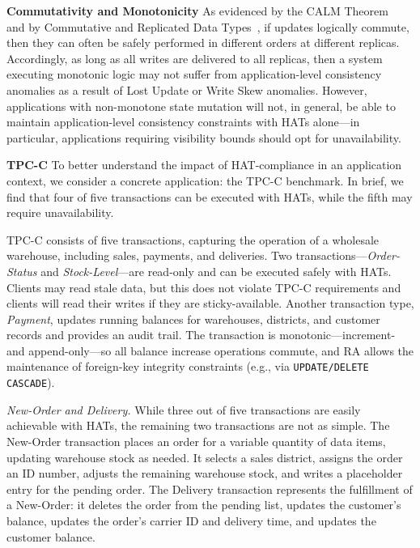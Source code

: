 \vspace{.5em}\noindent\textbf{Commutativity and Monotonicity} As
evidenced by the CALM Theorem~\cite{calm} and by Commutative and
Replicated Data Types~\cite{crdt}, if updates logically commute, then
they can often be safely performed in different orders at different
replicas. Accordingly, as long as all writes are delivered to all
replicas, then a system executing monotonic logic may not suffer from
application-level consistency anomalies as a result of Lost Update or
Write Skew anomalies. However, applications with non-monotone state
mutation will not, in general, be able to maintain application-level
consistency constraints with HATs alone---in particular, applications
requiring visibility bounds should opt for unavailability.

\vspace{.5em}\noindent\textbf{TPC-C} To better understand the impact
of HAT-compliance in an application context, we consider a concrete
application: the TPC-C benchmark. In brief, we find that four of five
transactions can be executed with HATs, while the fifth may require
unavailability.

TPC-C consists of five transactions, capturing the operation of a
wholesale warehouse, including sales, payments, and deliveries. Two
transactions---\textit{Order-Status} and \textit{Stock-Level}---are
read-only and can be executed safely with HATs. Clients may read stale
data, but this does not violate TPC-C requirements and clients will
read their writes if they are sticky-available. Another transaction
type, \textit{Payment}, updates running balances for warehouses,
districts, and customer records and provides an audit trail. The
transaction is monotonic---increment- and append-only---so all balance
increase operations commute, and RA allows the maintenance of
foreign-key integrity constraints (e.g., via \texttt{UPDATE/DELETE
  CASCADE}).

\vspace{.5em}\noindent\textit{New-Order and Delivery.} While three out of
five transactions are easily achievable with HATs, the remaining two
transactions are not as simple. The New-Order transaction places an
order for a variable quantity of data items, updating warehouse stock
as needed. It selects a sales district, assigns the order an ID
number, adjusts the remaining warehouse stock, and writes a
placeholder entry for the pending order. The Delivery transaction
represents the fulfillment of a New-Order: it deletes the order from
the pending list, updates the customer's balance, updates the order's
carrier ID and delivery time, and updates the customer balance.

